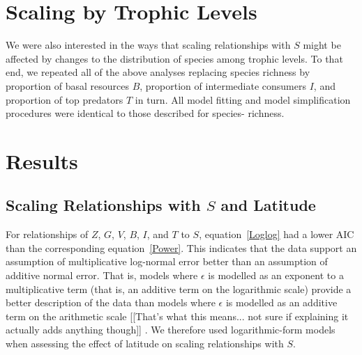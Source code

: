 \documentclass[12pt]{article}
\begin{document}


\section*{Scaling by Trophic Levels}

We were also interested in the ways that scaling relationships with $S$ might
be affected by changes to the distribution of species among trophic levels. To
that end, we repeated all of the above analyses replacing species richness by
proportion of basal resources $B$, proportion of intermediate consumers $I$,
and  proportion of top predators $T$ in turn. All model fitting and model
simplification procedures were identical to those described for species-
richness.



\section*{Results}

\subsection*{Scaling Relationships with $S$ and Latitude}

  For relationships of $Z$, $G$, $V$, $B$, $I$, and $T$ to $S$, equation~\ref{Loglog} had a
  lower AIC than the corresponding equation~\ref{Power}. This indicates that the
  data support an assumption of multiplicative log-normal error better than an
  assumption of additive normal error. That is, models where $\epsilon$ is
  modelled as an exponent to a multiplicative term (that is, an additive term on
  the logarithmic scale) provide a better description of the data than models
  where $\epsilon$ is modelled as an additive term on the arithmetic scale
  [[That's what this means... not sure if explaining it actually adds anything
  though]] .  We therefore used logarithmic-form models when assessing the
  effect of latitude on scaling relationships  with $S$.
\end{document}
